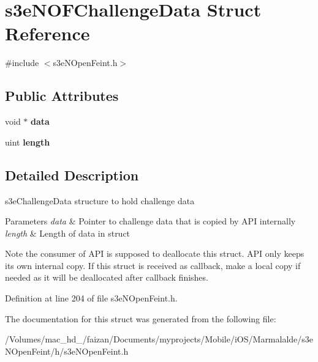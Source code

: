 \hypertarget{structs3e_n_o_f_challenge_data}{
\section{s3eNOFChallengeData Struct Reference}
\label{structs3e_n_o_f_challenge_data}
}


{\ttfamily \#include $<$s3eNOpenFeint.h$>$}

\subsection*{Public Attributes}
\begin{DoxyCompactItemize}
\item 
\hypertarget{structs3e_n_o_f_challenge_data_acb27730e16c5f0db8231c2c47307fd16}{
void $\ast$ {\bfseries data}}
\label{structs3e_n_o_f_challenge_data_acb27730e16c5f0db8231c2c47307fd16}

\item 
\hypertarget{group___n_open_feint_api_group_ga0a8617b1651e0991d5145ac746fadc8a}{
uint {\bfseries length}}
\label{group___n_open_feint_api_group_ga0a8617b1651e0991d5145ac746fadc8a}

\end{DoxyCompactItemize}


\subsection{Detailed Description}
s3eChallengeData structure to hold challenge data 
\begin{DoxyParams}{Parameters}
{\em data} & Pointer to challenge data that is copied by API internally \\
\hline
{\em length} & Length of data in struct \\
\hline
\end{DoxyParams}
\begin{DoxyNote}{Note}
the consumer of API is supposed to deallocate this struct. API only keeps its own internal copy. If this struct is received as callback, make a local copy if needed as it will be deallocated after callback finishes. 
\end{DoxyNote}


Definition at line 204 of file s3eNOpenFeint.h.



The documentation for this struct was generated from the following file:\begin{DoxyCompactItemize}
\item 
/Volumes/mac\_\-hd\_/faizan/Documents/myprojects/Mobile/iOS/Marmalalde/s3eNOpenFeint/h/s3eNOpenFeint.h\end{DoxyCompactItemize}
